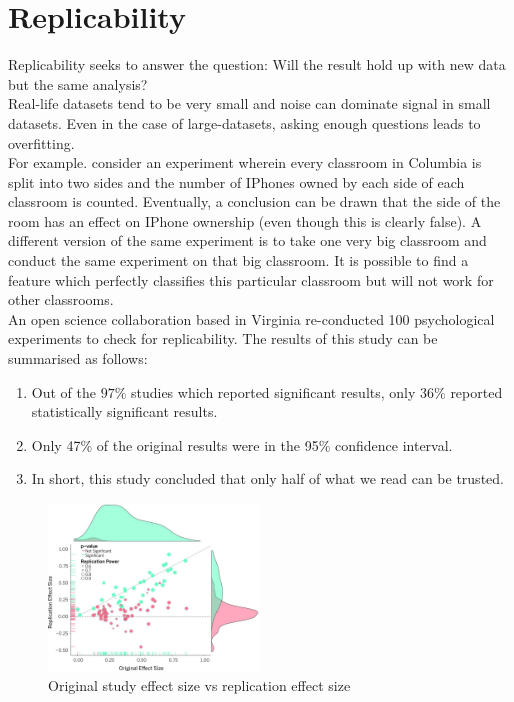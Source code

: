 \section{Replicability}
Replicability seeks to answer the question: Will the result hold up with new data but the same analysis? \\
Real-life datasets tend to be very small and noise can dominate signal in small datasets. Even in the case of large-datasets, asking enough questions leads to overfitting. \\
For example. consider an experiment wherein every classroom in Columbia is split into two sides and the number of IPhones owned by each side of each classroom is counted. Eventually, a conclusion can be drawn that the side of the room has an effect on IPhone ownership (even though this is clearly false). A different version of the same experiment is to take one very big classroom and conduct the same experiment on that big classroom. It is possible to find a feature which perfectly classifies this particular classroom but will not work for other classrooms. \\
An open science collaboration based in Virginia re-conducted 100 psychological experiments to check for replicability. The results of this study can be summarised as follows:
\begin{enumerate}
    \item Out of the $97\%$ studies which reported significant results, only $36\%$ reported statistically significant results.
    \item Only 47\% of the original results were in the 95\% confidence interval.
    \item In short, this study concluded that only half of what we read can be trusted. 
\end{enumerate}

\begin{figure}[ht]
  \begin{center}
    \includegraphics[width=0.5\textwidth,scale=2.0]{figures/replicationstudy.jpg}
    \caption{
      Original study effect size vs replication effect size}
    \label{fig:crisis}
  \end{center}
\end{figure}


